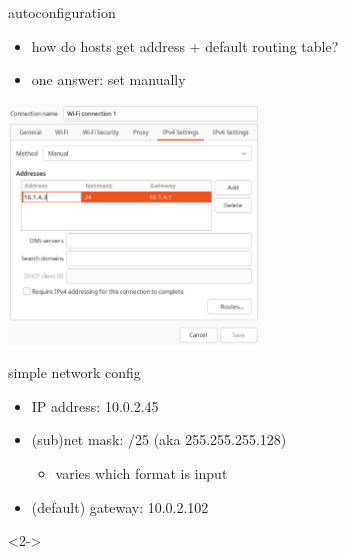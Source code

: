 \usetikzlibrary{matrix}
\begin{frame}{autoconfiguration}
    \begin{itemize}
    \item how do hosts get address + default routing table?
    \item one answer: set manually
    \end{itemize}
\includegraphics[width=0.5\textwidth]{../arp/ip-config-dialog}
\end{frame}

\begin{frame}{simple network config}
\begin{itemize}
    \item IP address: 10.0.2.45
    \item (sub)net mask: /25 (aka 255.255.255.128)
        \begin{itemize}
        \item varies which format is input
        \end{itemize}
    \item (default) gateway: 10.0.2.102
\end{itemize}
\begin{visibleenv}<2->
\end{visibleenv}
\end{frame}

